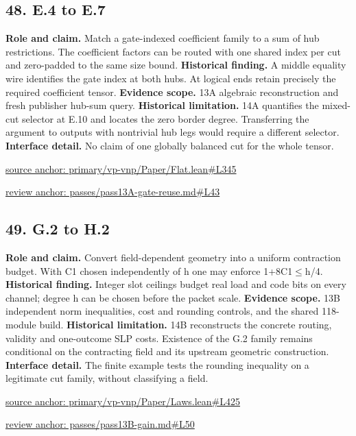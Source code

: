 \documentclass[11pt,letterpaper]{article}
\theoremstyle{definition}\newtheorem{definition}[theorem]{Definition}\newtheorem{example}[theorem]{Example}
\theoremstyle{remark}\newtheorem{remark}[theorem]{Remark}
\begin{document}
\subsection*{48. E.4 to E.7}
\textbf{Role and claim.} Match a gate-indexed coefficient family to a sum of hub restrictions. The coefficient factors can be routed with one shared index per cut and zero-padded to the same size bound.
\textbf{Historical finding.} A middle equality wire identifies the gate index at both hubs. At logical ends retain precisely the required coefficient tensor.
\textbf{Evidence scope.} 13A algebraic reconstruction and fresh publisher hub-sum query.
\textbf{Historical limitation.} 14A quantifies the mixed-cut selector at E.10 and locates the zero border degree. Transferring the argument to outputs with nontrivial hub legs would require a different selector.
\textbf{Interface detail.} No claim of one globally balanced cut for the whole tensor.
\par\href{https://github.com/nousentllc/VP-VNP-Review/blob/8a7976933b6b2b4ffda1ad3a0dfb5fc6b6f023e8/primary/vp-vnp/Paper/Flat.lean\#L345}{source anchor: primary/vp-vnp/Paper/Flat.lean\#L345}
\par\href{https://github.com/nousentllc/VP-VNP-Review/blob/8a7976933b6b2b4ffda1ad3a0dfb5fc6b6f023e8/passes/pass13A-gate-reuse.md\#L43}{review anchor: passes/pass13A-gate-reuse.md\#L43}
\goodbreak
{}
\hypertarget{claim.49}{}
\subsection*{49. G.2 to H.2}
\textbf{Role and claim.} Convert field-dependent geometry into a uniform contraction budget. With C1 chosen independently of h one may enforce 1+8C1\ensuremath{\le}h/4.
\textbf{Historical finding.} Integer slot ceilings budget real load and code bits on every channel; degree h can be chosen before the packet scale.
\textbf{Evidence scope.} 13B independent norm inequalities, cost and rounding controls, and the shared 118-module build.
\textbf{Historical limitation.} 14B reconstructs the concrete routing, validity and one-outcome SLP costs. Existence of the G.2 family remains conditional on the contracting field and its upstream geometric construction.
\textbf{Interface detail.} The finite example tests the rounding inequality on a legitimate cut family, without classifying a field.
\par\href{https://github.com/nousentllc/VP-VNP-Review/blob/8a7976933b6b2b4ffda1ad3a0dfb5fc6b6f023e8/primary/vp-vnp/Paper/Laws.lean\#L425}{source anchor: primary/vp-vnp/Paper/Laws.lean\#L425}
\par\href{https://github.com/nousentllc/VP-VNP-Review/blob/8a7976933b6b2b4ffda1ad3a0dfb5fc6b6f023e8/passes/pass13B-gain.md\#L50}{review anchor: passes/pass13B-gain.md\#L50}
\goodbreak
{}
\hypertarget{claim.50}{}
\end{document}
